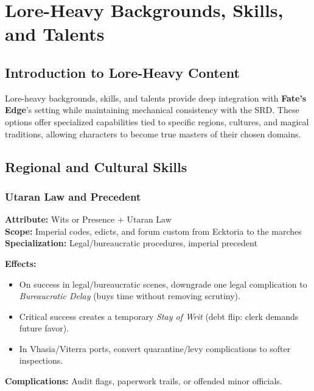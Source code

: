 \chapter{Lore-Heavy Backgrounds, Skills, and Talents}
\label{chap:lore-heavy}

\section{Introduction to Lore-Heavy Content}
\label{sec:lore-intro}

Lore-heavy backgrounds, skills, and talents provide deep integration with \textbf{Fate's Edge}'s setting while maintaining mechanical consistency with the SRD. These options offer specialized capabilities tied to specific regions, cultures, and magical traditions, allowing characters to become true masters of their chosen domains.

\section{Regional and Cultural Skills}
\label{sec:regional-skills}

\subsection{Utaran Law and Precedent}
\label{subsec:utaran-law}

\textbf{Attribute:} Wits or Presence + Utaran Law\\
\textbf{Scope:} Imperial codes, edicts, and forum custom from Ecktoria to the marches\\
\textbf{Specialization:} Legal/bureaucratic procedures, imperial precedent

\textbf{Effects:}
\begin{itemize}
\item On success in legal/bureaucratic scenes, downgrade one legal complication to \emph{Bureaucratic Delay} (buys time without removing scrutiny).
\item Critical success creates a temporary \emph{Stay of Writ} (debt flip: clerk demands future favor).
\item In Vhasia/Viterra ports, convert quarantine/levy complications to softer inspections.
\end{itemize}

\textbf{Complications:} Audit flags, paperwork trails, or offended minor officials.

